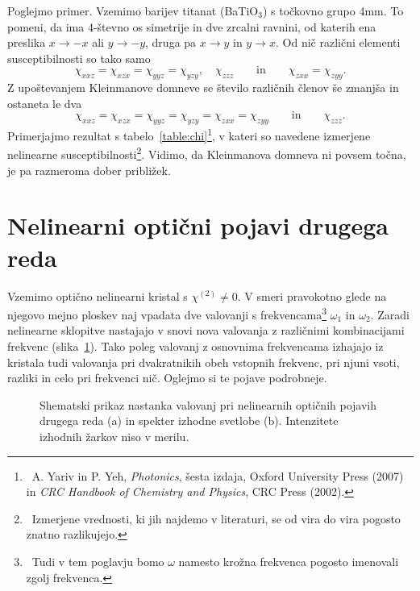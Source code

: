 Poglejmo primer. 
Vzemimo barijev titanat (BaTiO$_3$) s točkovno grupo 4mm. To pomeni, da
ima 4-števno os simetrije in dve zrcalni ravnini, od katerih ena preslika $x \to -x$ ali $y \to -y$, 
druga pa $x\to y$ in $y\to x$. Od nič različni elementi susceptibilnosti so tako samo
\begin{equation}
\chi_{xxz} = \chi_{xzx} =   \chi_{yyz} = \chi_{yzy}, \quad  \chi_{zzz} \qquad \mathrm{in} 
\qquad \chi_{zxx} = \chi_{zyy}.   
\end{equation}
Z upoštevanjem Kleinmanove domneve se število različnih členov še zmanjša in ostaneta le dva
\begin{equation}
\chi_{xxz} = \chi_{xzx} = \chi_{yyz} = \chi_{yzy} =\chi_{zxx} = \chi_{zyy} \qquad \mathrm{in} \qquad \chi_{zzz}.   
\end{equation}
Primerjajmo rezultat s tabelo~\ref{table:chi}\footnote{~A. Yariv in 
P. Yeh, {\it Photonics}, šesta izdaja, Oxford University Press (2007) in
{\it CRC Handbook of Chemistry and Physics}, CRC Press (2002).}, v kateri
so navedene izmerjene nelinearne susceptibilnosti\footnote{~Izmerjene vrednosti, 
ki jih najdemo v literaturi, se od vira do vira pogosto znatno razlikujejo.}. Vidimo, da Kleinmanova
domneva ni povsem točna, je pa razmeroma dober približek. 

\section{Nelinearni optični pojavi drugega reda}
Vzemimo optično nelinearni kristal s $\chi^{(2)} \neq 0$. V smeri pravokotno 
glede na njegovo mejno ploskev naj vpadata dve valovanji s frekvencama\footnote{~Tudi 
v tem poglavju bomo $\omega$ namesto krožna frekvenca pogosto imenovali zgolj frekvenca.}
$\omega_{1}$ in $\omega_{2}$. Zaradi nelinearne sklopitve nastajajo v snovi nova 
valovanja z različnimi kombinacijami frekvenc (slika~\ref{fig:nl2}).
Tako poleg valovanj z osnovnima frekvencama izhajajo iz kristala tudi 
valovanja pri dvakratnikih obeh vstopnih frekvenc, pri njuni vsoti, 
razliki in celo pri frekvenci nič. Oglejmo si te pojave podrobneje.
\begin{figure}[ht]
\centering
\def\svgwidth{140truemm} 

\caption{Shematski prikaz nastanka valovanj pri nelinearnih optičnih pojavih drugega reda (a)
in spekter izhodne svetlobe (b). Intenzitete izhodnih žarkov niso v merilu.}
\label{fig:nl2}
\end{figure}

